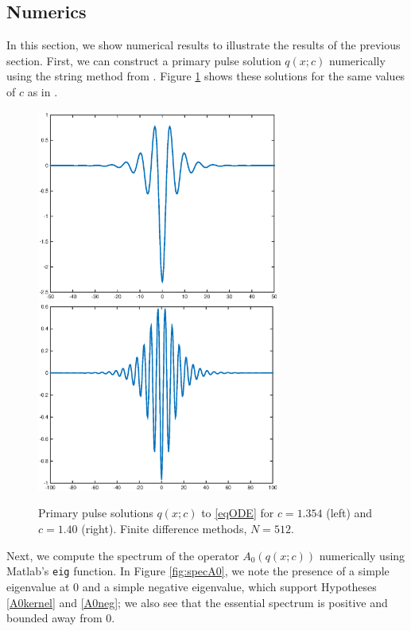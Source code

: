 \documentclass[12pt]{article}
\begin{document}
\subsection{Numerics}\label{sec:numerics}

In this section, we show numerical results to illustrate the results of the previous section. First, we can construct a primary pulse solution $q(x; c)$ numerically using the string method from \cite{Chamard2011}. Figure \ref{fig:single1} shows these solutions for the same values of $c$ as in \cite[Figure 3]{Chen1997}.

\begin{figure}[H]
\centering
\includegraphics[width=8cm]{single1354.eps}
\includegraphics[width=8cm]{single14.eps}
\caption{Primary pulse solutions $q(x;c)$ to \eqref{eqODE} for $c = 1.354$ (left) and $c = 1.40$ (right). Finite difference methods, $N = 512$.}
\label{fig:single1}
\end{figure}

Next, we compute the spectrum of the operator $A_0(q(x; c))$ numerically using Matlab's \texttt{eig} function. In Figure \ref{fig:specA0}, we note the presence of a simple eigenvalue at 0 and a simple negative eigenvalue, which support Hypotheses \ref{A0kernel} and \ref{A0neg}; we also see that the essential spectrum is positive and bounded away from 0.
\end{document}

